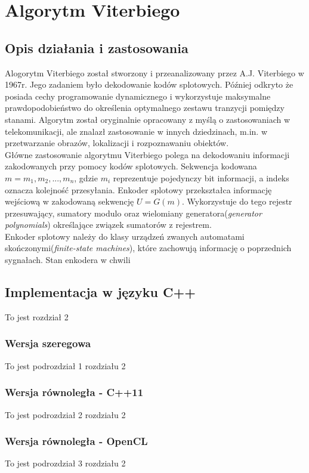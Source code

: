 \documentclass[document.tex]{subfiles}
\begin{document}
\chapter{Algorytm Viterbiego}
\section{Opis działania i zastosowania}
\indent Alogorytm Viterbiego został stworzony i przeanalizowany przez A.J. Viterbiego w 1967r. Jego zadaniem było dekodowanie kodów splotowych. Później odkryto że posiada cechy programowanie dynamicznego i wykorzystuje maksymalne prawdopodobieństwo do określenia optymalnego zestawu tranzycji pomiędzy stanami. Algorytm został oryginalnie opracowany z myślą o zastosowaniach w telekomunikacji, ale znalazł zastosowanie w innych dziedzinach, m.in. w przetwarzanie obrazów, lokalizacji i rozpoznawaniu obiektów.
\\
\indent Główne zastosowanie algorytmu Viterbiego polega na
dekodowaniu informacji zakodowanych przy pomocy kodów splotowych. Sekwencja kodowana $m = m_1, m_2,...,m_n$, gdzie 
$m_i$ reprezentuje pojedynczy bit informacji, a indeks oznacza kolejność przesyłania. Enkoder splotowy przekształca informację wejściową w zakodowaną sekwencję $U = G(m)$.
Wykorzystuje do tego rejestr przesuwający, sumatory modulo oraz wielomiany generatora(\textit{generator polynomials}) określające związek sumatorów z rejestrem. 
\\
\indent Enkoder splotowy należy do klasy urządzeń zwanych automatami skończonymi(\textit{finite-state machines}), które zachowują informację o poprzednich sygnałach.
Stan enkodera w chwili %



\section{Implementacja w języku C++}
To jest rozdział 2
	\subsection{Wersja szeregowa}
	To jest podrozdział 1 rozdziału 2
	\subsection{Wersja równoległa - C++11}
	To jest podrozdział 2 rozdziału 2
	\subsection{Wersja równoległa - OpenCL}
	To jest podrozdział 3 rozdziału 2
\end{document}

